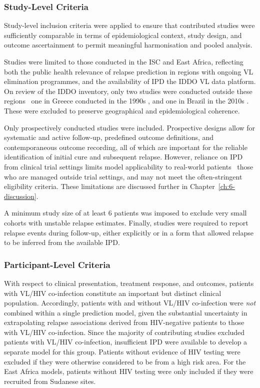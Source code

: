 \subsubsection{Study-Level Criteria}

Study-level inclusion criteria were applied to ensure that contributed studies were sufficiently comparable in terms of epidemiological context, study design, and outcome ascertainment to permit meaningful harmonisation and pooled analysis.

Studies were limited to those conducted in the ISC and East Africa, reflecting both the public health relevance of relapse prediction in regions with ongoing VL elimination programmes, and the availability of IPD the IDDO VL data platform. On review of the IDDO inventory\cite{iddo2025vlinventory}, only two studies were conducted outside these regions \textemdash\ one in Greece conducted in the 1990s \cite{syriopoulou2003}, and one in Brazil in the 2010s \cite{romero2017}. These were excluded to preserve geographical and epidemiological coherence.

Only prospectively conducted studies were included. Prospective designs allow for systematic and active follow-up, predefined outcome definitions, and contemporaneous outcome recording, all of which are important for the reliable identification of initial cure and subsequent relapse. However, reliance on IPD from clinical trial settings limits model applicability to real-world patients \textemdash\ those who are managed outside trial settings, and may not meet the often-stringent eligibility criteria. These limitations are discussed further in Chapter~\ref{ch:6-discussion}.

A minimum study size of at least 6 patients was imposed to exclude very small cohorts with unstable relapse estimates. Finally, studies were required to report relapse events during follow-up, either explicitly or in a form that allowed relapse to be inferred from the available IPD.

\subsubsection*{Participant-Level Criteria}

With respect to clinical presentation, treatment response, and outcomes, patients with VL/HIV co-infection constitute an important but distinct clinical population. Accordingly, patients with and without VL/HIV co-infection were \textit{not} combined within a single prediction model, given the substantial uncertainty in extrapolating relapse associations derived from HIV-negative patients to those with VL/HIV co-infection. Since the majority of contributing studies excluded patients with VL/HIV co-infection, insufficient IPD were available to develop a separate model for this group. Patients without evidence of HIV testing were excluded if they were otherwise considered to be from a high risk area. For the East Africa models, patients without HIV testing were only included if they were recruited from Sudanese sites.

